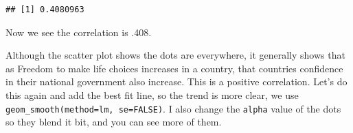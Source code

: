 \documentclass[]{book}
\newenvironment{Shaded}{\begin{snugshade}}{\end{snugshade}}
\newcommand{\KeywordTok}[1]{\textcolor[rgb]{0.13,0.29,0.53}{\textbf{{#1}}}}
\newcommand{\DataTypeTok}[1]{\textcolor[rgb]{0.13,0.29,0.53}{{#1}}}
\newcommand{\StringTok}[1]{\textcolor[rgb]{0.31,0.60,0.02}{{#1}}}
\newcommand{\NormalTok}[1]{{#1}}
\theoremstyle{definition}
\theoremstyle{definition}
\theoremstyle{definition}
\theoremstyle{remark}
\begin{document}
\begin{Shaded}
\end{Shaded}

\begin{verbatim}
## [1] 0.4080963
\end{verbatim}

Now we see the correlation is .408.

Although the scatter plot shows the dots are everywhere, it generally
shows that as Freedom to make life choices increases in a country, that
countries confidence in their national government also increase. This is
a positive correlation. Let's do this again and add the best fit line,
so the trend is more clear, we use
\texttt{geom\_smooth(method=lm,\ se=FALSE)}. I also change the
\texttt{alpha} value of the dots so they blend it bit, and you can see
more of them.
\end{document}
